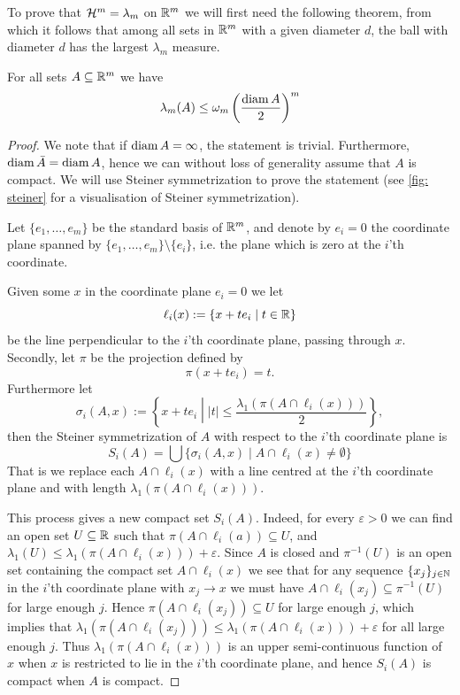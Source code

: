 To prove that $\mathcal{H}^m=\lambda_m$ on $\mathbb{R}^m$ we will first need the following theorem, from which it follows that among all sets in $\mathbb{R}^m$ with a given diameter $d$, the ball with diameter $d$ has the largest $\lambda_m$ measure.
\begin{theorem}\label{thm: isodiametric inequality}
For all sets $A \subseteq \mathbb{R}^m$ we have
\[
    \lambda_m(A) \le \omega_m\left(\frac{\operatorname{diam} A}{2}\right)^m
\]
\end{theorem}
\begin{proof}
We note that if $\operatorname{diam} A = \infty$, the statement is trivial. Furthermore, $\operatorname{diam} \bar{A} = \operatorname{diam} A$, hence we can without loss of generality assume that $A$ is compact. We will use Steiner symmetrization to prove the statement (see \cref{fig: steiner} for a visualisation of Steiner symmetrization).

Let $\{e_1, \dots, e_m\}$ be the standard basis of $\mathbb{R}^m$, and denote by $e_i=0$ the coordinate plane spanned by $\{e_1, \dots, e_m\} \setminus \{e_i\}$, i.e. the plane which is zero at the $i$'th coordinate.

Given some $x$ in the coordinate plane $e_i=0$ we let
\[
    \ell_i(x) := \{x + t e_i \mid t \in \mathbb{R} \}
\]
be the line perpendicular to the $i$'th coordinate plane, passing through $x$.
Secondly, let $\pi$ be the projection defined by
\[
    \pi(x+t e_i)=t.
\]
Furthermore let
\[
    \sigma_i(A,x):=\left\{x+t e_i \middle| |t| \le \frac{\lambda_1(\pi(A \cap \ell_i(x)))}{2} \right\},
\]
then the Steiner symmetrization of $A$ with respect to the $i$'th coordinate plane is
\[
    S_i(A)=\bigcup\{\sigma_i(A,x) \mid A \cap \ell_i(x) \neq \emptyset\}
\]
That is we replace each $A \cap \ell_i(x)$ with a line centred at the $i$'th coordinate plane and with length $\lambda_1(\pi(A \cap \ell_i(x)))$.


This process gives a new compact set $S_i(A)$. Indeed, for every $\varepsilon > 0$ we can find an open set $U \subseteq \mathbb{R}$ such that $\pi(A \cap \ell_i(a)) \subseteq U$, and $\lambda_1(U) \le \lambda_1(\pi(A \cap \ell_i(x))) + \varepsilon$. Since $A$ is closed and $\pi^{-1}(U)$ is an open set containing the compact set $A \cap \ell_i(x)$ we see that for any sequence $\{x_j\}_{j \in \mathbb{N}}$ in the $i$'th coordinate plane with $x_j \to x$ we must have $A \cap \ell_i(x_j) \subseteq \pi^{-1}(U)$ for large enough $j$. Hence $\pi(A \cap \ell_i(x_j))\subseteq U$ for large enough $j$, which implies that $\lambda_1(\pi(A \cap \ell_i(x_j))) \le \lambda_1(\pi(A \cap \ell_i(x))) + \varepsilon$ for all large enough $j$. Thus $\lambda_1(\pi(A \cap \ell_i(x)))$ is an upper semi-continuous function of $x$ when $x$ is restricted to lie in the $i$'th coordinate plane, and hence $S_i(A)$ is compact when $A$ is compact.


\end{proof}
